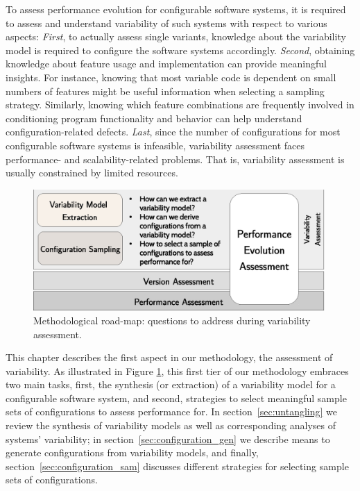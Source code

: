 To assess performance evolution for configurable software systems, it is
required to assess and understand variability of such systems with respect to
various aspects: \emph{First}, to actually assess single variants, knowledge
about the variability model is required to configure the software systems accordingly.
\emph{Second}, obtaining knowledge about feature usage and implementation can
provide meaningful insights. For instance, knowing that most variable code is dependent
on small numbers of features might be useful information when selecting a
sampling strategy. Similarly, knowing which feature combinations are frequently
involved in conditioning program functionality and behavior can help understand
configuration-related defects. \emph{Last}, since the number of configurations
for most configurable software systems is infeasible, variability assessment faces
performance- and scalability-related problems. That is, variability assessment
is usually constrained by limited resources.

\begin{figure}[h!]
	\centering
	\includegraphics[width=0.99\textwidth]{images/process_varassesment.eps}
	\caption{Methodological road-map: questions to address during variability
	assessment.}
	\label{fig:roadmap_1}
\end{figure}
 
This chapter describes the first aspect in our methodology, the assessment of
variability. As illustrated in Figure \ref{fig:roadmap_1}, this first tier of
our methodology embraces two main tasks, first, the synthesis (or extraction) of a variability model for a configurable software system, and second, strategies to select
meaningful sample sets of configurations to assess performance for. In
section~\ref{sec:untangling} we review the synthesis of variability models as
well as corresponding analyses of systems’ variability; in
section~\ref{sec:configuration_gen} we describe means to generate configurations from variability models, and finally,
section~\ref{sec:configuration_sam} discusses different strategies for selecting
sample sets of configurations.


